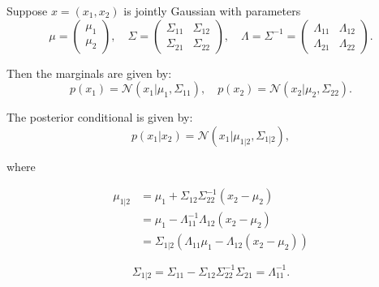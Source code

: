 \begin{theorem}
\label{thm:marginals-and-conditionals-mvn}
Suppose \( x = (x_1, x_2) \) is jointly Gaussian with parameters
\begin{equation}
\mu = \begin{pmatrix}
\mu_1 \\
\mu_2
\end{pmatrix}, \quad
\Sigma = \begin{pmatrix}
\Sigma_{11} & \Sigma_{12} \\
\Sigma_{21} & \Sigma_{22}
\end{pmatrix}, \quad
\Lambda = \Sigma^{-1} = \begin{pmatrix}
\Lambda_{11} & \Lambda_{12} \\
\Lambda_{21} & \Lambda_{22}
\end{pmatrix}.
\end{equation}

Then the marginals are given by:
\begin{equation}
p(x_1) = \mathcal{N}(x_1 | \mu_1, \Sigma_{11}), \quad p(x_2) = \mathcal{N}(x_2 | \mu_2, \Sigma_{22}).
\end{equation}

The posterior conditional is given by:
\begin{equation}
p(x_1 | x_2) = \mathcal{N}(x_1 | \mu_{1|2}, \Sigma_{1|2}),
\end{equation}

where

\begin{align}
\mu_{1|2}
&= \mu_1 + \Sigma_{12} \Sigma_{22}^{-1} (x_2 - \mu_2)\\
&= \mu_1 - \Lambda_{11}^{-1} \Lambda_{12} (x_2 - \mu_2)\\
&=\Sigma_{1|2} \left( \Lambda_{11} \mu_1 - \Lambda_{12} (x_2 - \mu_2) \right)
\end{align}

\begin{equation}
\Sigma_{1|2} = \Sigma_{11} - \Sigma_{12} \Sigma_{22}^{-1} \Sigma_{21} = \Lambda_{11}^{-1}.
\end{equation}
\end{theorem}



